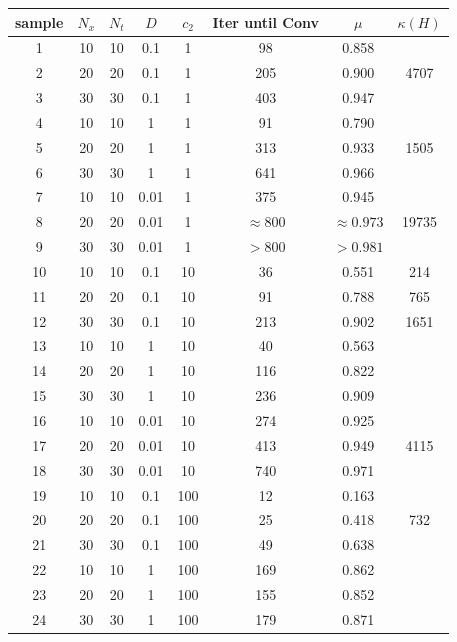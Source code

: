 \documentclass[../draft_1.tex]{subfiles}
\begin{document}
\begin{table}[]
	\centering
	\begin{tabular}{||c|c|c|c|c|c|c|c||}
		\toprule
		sample & $N_x$ & $N_t$ & $D$ & $c_2$ & Iter until Conv & $\mu$ & $\kappa(H)$  \\
		\bottomrule
		\toprule
		1 & 10 & 10 & 0.1 & 1 & 98 & 0.858 &  \\ \hline
		2 & 20 & 20 & 0.1 & 1 & 205 & 0.900 & 4707 \\ \hline
		3 & 30 & 30 & 0.1 &  1 & 403 & 0.947 &  \\ 
		\toprule
		4 & 10 & 10 & 1 & 1 & 91 & 0.790 &  \\ \hline
		5 & 20 & 20 & 1 & 1 & 313 & 0.933 & 1505 \\ \hline
		6 & 30 & 30 & 1 & 1 & 641 & 0.966 &  \\ 
		\toprule
		7 & 10 & 10 & 0.01 & 1 & 375 & 0.945 &  \\ \hline
		8 & 20 & 20 & 0.01 & 1 & $\approx 800$ & $\approx 0.973$ & 19735 \\ \hline
		9 & 30 & 30 & 0.01 & 1 & $>800$ & $>0.981$ &  \\ 
		\bottomrule
		\toprule
		10 & 10 & 10 & 0.1 & 10 & 36 & 0.551 & 214 \\ \hline
		11 & 20 & 20 & 0.1 & 10 &  91 & 0.788 & 765 \\ \hline
	    12 & 30 & 30 & 0.1 &  10  & 213 & 0.902 & 1651 \\ 
		\toprule
		13 & 10 & 10 & 1 & 10 & 40 & 0.563 &  \\ \hline
		14 & 20 & 20 & 1 & 10 & 116 & 0.822 &  \\ \hline
		15 & 30 & 30 & 1 & 10 & 236 & 0.909 &  \\ 
		\toprule
		16 & 10 & 10 & 0.01 & 10 &   274 & 0.925 & \\ \hline
		17 & 20 & 20 & 0.01 & 10 &  413 & 0.949 & 4115 \\ \hline
		18 & 30 & 30 & 0.01 & 10 & 740 & 0.971 &  \\ 
		\bottomrule
	     \toprule
		19 & 10 & 10 & 0.1 & 100 & 12 & 0.163 &  \\ \hline
		20 & 20 & 20 & 0.1 & 100 & 25  & 0.418 & 732 \\ \hline
		21 & 30 & 30 & 0.1 &  100 &  49 & 0.638 &  \\ 
		\toprule
		22 & 10 & 10 & 1 & 100 & 169 & 0.862 &  \\ \hline
		23 & 20 & 20 & 1 & 100  & 155 & 0.852 & \\ \hline
		24 & 30 & 30 & 1 & 100 &  179 & 0.871 &  \\ 

\end{tabular}
\end{table}
\end{document}
